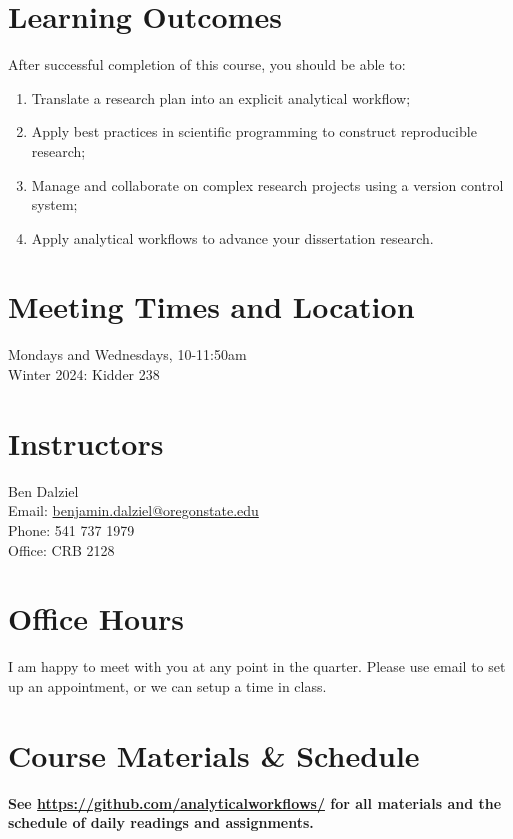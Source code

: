 \documentclass[10pt]{article}
\begin{document}
\section*{Learning Outcomes}
\noindent
After successful completion of this course, you should be able to:
\begin{enumerate}
	\itemsep0em
	\item Translate a research plan into an explicit analytical workflow;
	\item Apply best practices in scientific programming to construct reproducible research;
	\item Manage and collaborate on complex research projects using a version control system;
	\item Apply analytical workflows to advance your dissertation research.
\end{enumerate}

\section*{Meeting Times and Location}
\noindent
	Mondays and Wednesdays, 10-11:50am\\
	Winter 2024: Kidder 238

\section*{Instructors}
\noindent
	Ben Dalziel\\
	Email: \href{mailto:benjamin.dalziel@oregonstate.edu}{benjamin.dalziel@oregonstate.edu}\\
	Phone: 541 737 1979\\
	Office: CRB 2128\\


\section*{Office Hours}
\noindent
	I am happy to meet with you at any point in the quarter. Please use email to set up an appointment, or we can setup a time in class.

	\clearpage
\section*{Course Materials \& Schedule}
\noindent
\begin{center}
\textbf{See
\href{https://github.com/analyticalworkflows}{https://github.com/analyticalworkflows/}
 for all materials and the schedule of daily readings and assignments.}
\end{center}
\end{document}
